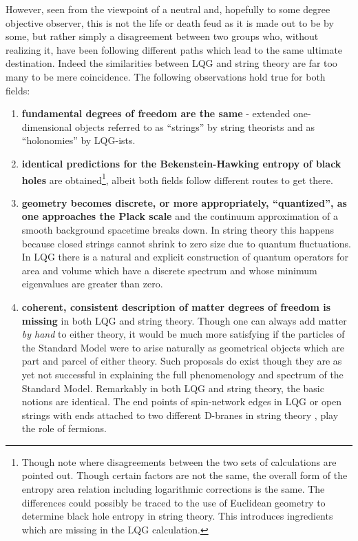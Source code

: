 \documentclass[11pt,a4paper,nofootinbib]{revtex4-1}
\begin{document}
However, seen from the viewpoint of a neutral and, hopefully to some degree objective observer, this is not the life or death feud as it is made out to be by some, but rather simply a disagreement between two groups who, without realizing it, have been following different paths which lead to the same ultimate destination. Indeed the similarities between LQG and string theory are far too many to be mere coincidence. The following observations hold true for both fields:
\begin{enumerate}
	\item \textbf{fundamental degrees of freedom are the same} - extended one-dimensional objects referred to as ``strings'' by string theorists and as ``holonomies'' by LQG-ists.
	\item \textbf{identical predictions for the Bekenstein-Hawking entropy of black holes} are obtained\footnote{Though note \cite{Sen2012Logarithmic,Sen2014Microscopic} where disagreements between the two sets of calculations are pointed out. Though certain factors are not the same, the overall form of the entropy area relation including logarithmic corrections is the same. The differences could possibly be traced to the use of Euclidean geometry to determine black hole entropy in string theory. This introduces ingredients which are missing in the LQG calculation.}, albeit both fields follow different routes to get there.
	\item \textbf{geometry becomes discrete, or more appropriately, ``quantized'', as one approaches the Plack scale} and the continuum approximation of a smooth background spacetime breaks down. In string theory this happens because closed strings cannot shrink to zero size due to quantum fluctuations. In LQG there is a natural and explicit construction \cite{Ashtekar1992Weaving,Rovelli1993Area,Rovelli1994Discreteness} of quantum operators for area and volume which have a discrete spectrum and whose minimum eigenvalues are greater than zero.
	\item \textbf{coherent, consistent description of matter degrees of freedom is missing} in both LQG and string theory. Though one can always add matter \emph{by hand} to either theory, it would be much more satisfying if the particles of the Standard Model were to arise naturally as geometrical objects which are part and parcel of either theory. Such proposals do exist \cite{Bilson-Thompson2005A-topological,Bilson-Thompson2006Quantum,Wan2007Braid, Vaid2010Embedding} though they are as yet not successful in explaining the full phenomenology and spectrum of the Standard Model. Remarkably in both LQG and string theory, the basic notions are identical. The end points of spin-network edges in LQG \cite{Morales-Tecotl1994Fermions} or open strings with ends attached to two different D-branes in string theory \cite[Ch. 21]{Zwiebach2009A-First}, play the role of fermions.

\end{enumerate}
\end{document}
